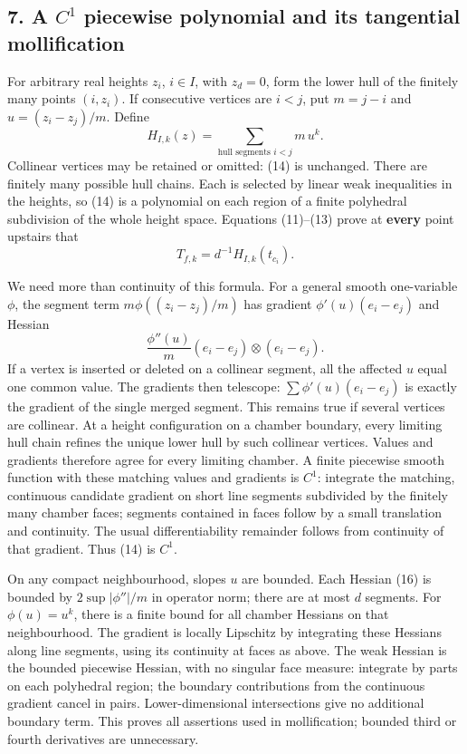 \documentclass[
  11pt,
]{article}
\begin{document}
\subsection{\texorpdfstring{7. A \(C^1\) piecewise polynomial and its
tangential
mollification}{7. A C\^{}1 piecewise polynomial and its tangential mollification}}\label{a-c1-piecewise-polynomial-and-its-tangential-mollification}

For arbitrary real heights \(z_i\), \(i\in I\), with \(z_d=0\), form the
lower hull of the finitely many points \((i,z_i)\). If consecutive
vertices are \(i<j\), put \(m=j-i\) and \(u=(z_i-z_j)/m\). Define \[
               H_{I,k}(z)=\sum_{\text{hull segments }i<j}
                                 m\,u^k.                \tag{14}
\] Collinear vertices may be retained or omitted: (14) is unchanged.
There are finitely many possible hull chains. Each is selected by linear
weak inequalities in the heights, so (14) is a polynomial on each region
of a finite polyhedral subdivision of the whole height space. Equations
(11)--(13) prove at \textbf{every} point upstairs that \[
               T_{f,k}=d^{-1}H_{I,k}(t_{c_i}).            \tag{15}
\]

We need more than continuity of this formula. For a general smooth
one-variable \(\phi\), the segment term \(m\phi((z_i-z_j)/m)\) has
gradient \(\phi'(u)(e_i-e_j)\) and Hessian \[
            \frac{\phi''(u)}m(e_i-e_j)\otimes(e_i-e_j).  \tag{16}
\] If a vertex is inserted or deleted on a collinear segment, all the
affected \(u\) equal one common value. The gradients then telescope:
\(\sum\phi'(u)(e_i-e_j)\) is exactly the gradient of the single merged
segment. This remains true if several vertices are collinear. At a
height configuration on a chamber boundary, every limiting hull chain
refines the unique lower hull by such collinear vertices. Values and
gradients therefore agree for every limiting chamber. A finite piecewise
smooth function with these matching values and gradients is \(C^1\):
integrate the matching, continuous candidate gradient on short line
segments subdivided by the finitely many chamber faces; segments
contained in faces follow by a small translation and continuity. The
usual differentiability remainder follows from continuity of that
gradient. Thus (14) is \(C^1\).

On any compact neighbourhood, slopes \(u\) are bounded. Each Hessian
(16) is bounded by \(2\sup|\phi''|/m\) in operator norm; there are at
most \(d\) segments. For \(\phi(u)=u^k\), there is a finite bound for
all chamber Hessians on that neighbourhood. The gradient is locally
Lipschitz by integrating these Hessians along line segments, using its
continuity at faces as above. The weak Hessian is the bounded piecewise
Hessian, with no singular face measure: integrate by parts on each
polyhedral region; the boundary contributions from the continuous
gradient cancel in pairs. Lower-dimensional intersections give no
additional boundary term. This proves all assertions used in
mollification; bounded third or fourth derivatives are unnecessary.
\end{document}
